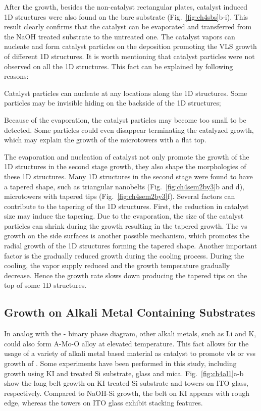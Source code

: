 After the growth, besides the non-catalyst rectangular plates, catalyst induced 1D structures were also found on the bare substrate (Fig.~\ref{fig:ch4sbs}b-i). This result clearly confirms that the catalyst can be evaporated and transferred from the NaOH treated substrate to the untreated one. The catalyst vapors can nucleate and form catalyst particles on the  deposition promoting the VLS growth of different 1D structures. It is worth mentioning that catalyst particles were not observed on all the 1D structures. This fact can be explained by following reasons:
\begin{enumerate*}[label=\itshape\alph*\upshape)]
\item Catalyst particles can nucleate at any locations along the 1D structures. Some particles may be invisible hiding on the backside of the 1D structures;
\item Because of the evaporation, the catalyst particles may become too small to be detected. Some particles could even disappear terminating the catalyzed growth, which may explain the growth of the microtowers with a flat top.
\end{enumerate*} The evaporation and nucleation of catalyst not only promote the growth of the 1D structures in the second stage growth, they also shape the morphologies of these 1D structures. Many 1D structures in the second stage were found to have a tapered shape, such as triangular nanobelts (Fig.~\ref{fig:ch4sem2by3}b and d), microtowers with tapered tips (Fig.~\ref{fig:ch4sem2by3}f). Several factors can contribute to the tapering of the 1D structures. First, the reduction in catalyst size may induce the tapering. Due to the evaporation, the size of the catalyst particles can shrink during the growth resulting in the tapered growth. The \gls{vs} growth on the side surfaces is another possible mechanism, which promotes the radial growth of the 1D structures forming the tapered shape. Another important factor is the gradually reduced growth during the cooling process. During the cooling, the  vapor supply reduced and the growth temperature gradually decrease. Hence the growth rate slows down producing the tapered tips on the top of some 1D structures.

\subsection{Growth on Alkali Metal Containing Substrates}\label{sec:glass}
In analog with the - binary phase diagram, other alkali metals, such as Li and K, could also form A-Mo-O alloy at elevated temperature. This fact allows for the usage of a variety of alkali metal based material as catalyst to promote \gls{vls} or \gls{vss} growth of . Some experiments have been performed in this study, including growth using KI and  treated Si substrate, glass and mica. Fig.~\ref{fig:ch4al1}a-b show the long belt growth on KI treated Si substrate and towers on ITO glass, respectively. Compared to NaOH-Si growth, the belt on KI appears with rough edge, whereas the towers on ITO glass exhibit stacking features. 

